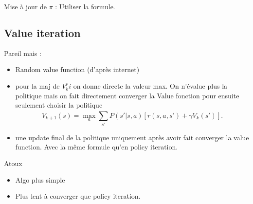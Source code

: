 \documentclass{article}
\theoremstyle{plain}%
\theoremstyle{definition}
\theoremstyle{remark}
\begin{document}
Mise à jour de $ \pi $ : Utiliser la formule.

\subsection{Value iteration}
Pareil mais :\begin{itemize}
    \item Random value function (d'après internet)
    \item pour la maj de $ V_k^pi $ on donne directe la valeur max. On n'évalue plus la politique mais on fait directement converger la Value fonction pour ensuite seulement choisir la politique
    \[
        V_{k+1}(s) = \max _a \sum_{s'}^{}P(s'|s, a)[r(s,a,s') + \gamma V_k (s')]
    .\]
    \item une update final de la politique uniquement après avoir fait converger la value function. Avec la même formule qu'en policy iteration.
\end{itemize}
Atoux \begin{itemize}
    \item Algo plus simple
    \item Plus lent à converger que policy iteration.
\end{itemize}
\end{document}
